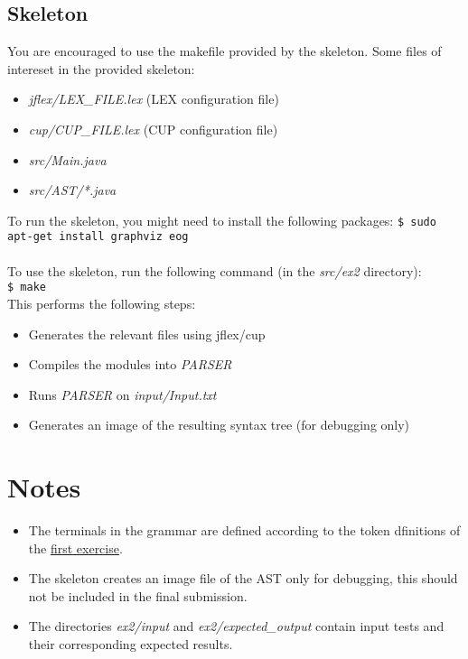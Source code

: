 \documentclass{article}
\begin{document}
\subsection{Skeleton}
You are encouraged to use the makefile provided by the skeleton.
Some files of intereset in the provided skeleton:
\begin{itemize}
    \item \textit{jflex/LEX\_FILE.lex} (LEX configuration file)
    \item \textit{cup/CUP\_FILE.lex} (CUP configuration file)
    \item \textit{src/Main.java}
    \item \textit{src/AST/*.java}
\end{itemize}
To run the skeleton, you might need to install the following packages:
\texttt{\$ sudo apt-get install graphviz eog} \\ \\
To use the skeleton, run the following command (in the \textit{src/ex2} directory): \\
\texttt{\$ make} \\
This performs the following steps:
\begin{itemize}
    \item Generates the relevant files using jflex/cup
    \item Compiles the modules into \textit{PARSER}
    \item Runs \textit{PARSER} on \textit{input/Input.txt}
    \item Generates an image of the resulting syntax tree (for debugging only)
\end{itemize}

\section{Notes}
\begin{itemize}
\item
The terminals in the grammar are defined according to the token dfinitions of the
\href{https://github.com/davidtr1037/compilation-tau/blob/master/exercises/ex1/ex1.pdf}{first exercise}.
\item
The skeleton creates an image file of the AST only for debugging,
this should not be included in the final submission.
\item
The directories \textit{ex2/input} and \textit{ex2/expected\_output} contain input tests and their corresponding expected results.
\end{itemize}
\end{document}
